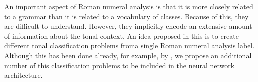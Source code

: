 

An important aspect of Roman numeral analysis is that it is
more closely related to a grammar than it is related to a
vocabulary of classes. Because of this, they are difficult
to understand. However, they implicitly encode an extensive
amount of information about the tonal context. An idea
proposed in this \thesisdiss is to create different tonal
classification problems froma single Roman numeral analysis
label. Although this has been done already, for example, by
\textcite{chen2018functional}, we propose an additional
number of this classification problems to be included in the
neural network architecture.
